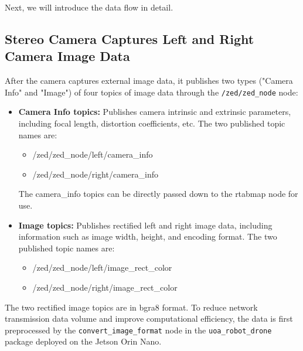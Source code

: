Next, we will introduce the data flow in detail.
\subsection{Stereo Camera Captures Left and Right Camera Image Data}

After the camera captures external image data, it publishes two types ("Camera Info" and "Image") of four topics of image data through the \texttt{/zed/zed\_node} node:
\begin{itemize}
    \item \textbf{Camera Info topics:} Publishes camera intrinsic and extrinsic parameters, including focal length, distortion coefficients, etc. The two published topic names are:
    \begin{itemize}
        \item /zed/zed\_node/left/camera\_info
        \item /zed/zed\_node/right/camera\_info 
    \end{itemize}
    The camera\_info topics can be directly passed down to the rtabmap node for use.
    \item \textbf{Image topics:} Publishes rectified left and right image data, including information such as image width, height, and encoding format. The two published topic names are:
    \begin{itemize}
        \item /zed/zed\_node/left/image\_rect\_color
        \item /zed/zed\_node/right/image\_rect\_color
    \end{itemize}
\end{itemize}

\sloppy
The two rectified image topics are in bgra8 format. To reduce network transmission data volume and improve computational efficiency, the data is first preprocessed by the \texttt{convert\_image\_format} node in the \texttt{uoa\_robot\_drone} package deployed on the Jetson Orin Nano.

